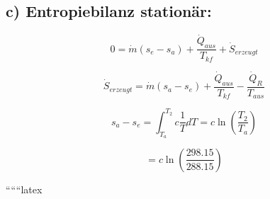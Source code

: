 \subsection*{c) Entropiebilanz stationär:}

\[
0 = \dot{m} (s_e - s_a) + \frac{\dot{Q}_{aus}}{T_{kf}} + \dot{S}_{erzeugt}
\]

\[
\dot{S}_{erzeugt} = \dot{m} (s_a - s_e) + \frac{\dot{Q}_{aus}}{T_{kf}} - \frac{\dot{Q}_{R}}{T_{aus}}
\]

\[
s_a - s_e = \int_{T_a}^{T_2} c \frac{1}{T} dT = c \ln \left( \frac{T_2}{T_a} \right)
\]

\[
= c \ln \left( \frac{298.15}{288.15} \right)
\]

``````latex